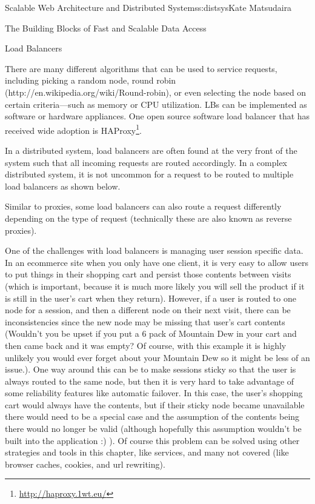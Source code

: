 \begin{aosachapter}{Scalable Web Architecture and Distributed Systems}{s:distsys}{Kate Matsudaira}
\begin{aosasect1}{The Building Blocks of Fast and Scalable Data Access}
\begin{aosasect2}{Load Balancers}

There are many different algorithms that can be used to service
requests, including picking a random node, round robin
(http://en.wikipedia.org/wiki/Round-robin), or even selecting the node
based on certain criteria---such as memory or CPU utilization. LBs can
be implemented as software or hardware appliances. One open source
software load balancer that has received wide adoption is
HAProxy\footnote{\url{http://haproxy.1wt.eu/}}.

In a distributed system, load balancers are often found at the very
front of the system such that all incoming requests are routed
accordingly. In a complex distributed system, it is not uncommon for a
request to be routed to multiple load balancers as shown below.


Similar to proxies, some load balancers can also route a request
differently depending on the type of request (technically these are
also known as reverse proxies).

One of the challenges with load balancers is managing user session
specific data. In an ecommerce site when you only have one client, it
is very easy to allow users to put things in their shopping cart and
persist those contents between visits (which is important, because it
is much more likely you will sell the product if it is still in the
user’s cart when they return). However, if a user is routed to one
node for a session, and then a different node on their next visit,
there can be inconsistencies since the new node may be missing that
user’s cart contents (Wouldn’t you be upset if you put a 6 pack of
Mountain Dew in your cart and then came back and it was empty? Of
course, with this example it is highly unlikely you would ever forget
about your Mountain Dew so it might be less of an issue.). One way
around this can be to make sessions sticky so that the user is always
routed to the same node, but then it is very hard to take advantage of
some reliability features like automatic failover. In this case, the
user’s shopping cart would always have the contents, but if their
sticky node became unavailable there would need to be a special case
and the assumption of the contents being there would no longer be
valid (although hopefully this assumption wouldn’t be built into the
application :) ). Of course this problem can be solved using other
strategies and tools in this chapter, like services, and many not
covered (like browser caches, cookies, and url rewriting).


\end{aosasect2}
\end{aosasect1}
\end{aosachapter}
